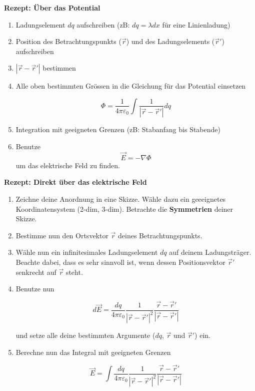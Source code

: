 \begin{tcolorbox}
    
    \footnotesize{
    \textbf{Rezept: Über das Potential}
    \begin{enumerate}
        \item Ladungselement $dq$ aufschreiben (zB: $dq = \lambda dx$ für eine Linienladung)
        \item Position des Betrachtungspunkts ($\vec{r}$) und des Ladungselements ($\vec{r}'$) aufschreiben
        \item $|\vec{r}- \vec{r}'|$ bestimmen
        \item Alle oben bestimmten Grössen in die Gleichung für das Potential einsetzen
        
        \begin{equation*}
        \Phi = \frac{1}{4 \pi \varepsilon_0}\int \frac{1}{|\vec{r}- \vec{r}'|} dq
        \end{equation*}
        
        \item Integration mit geeigneten Grenzen (zB: Stabanfang bis Stabende)
        \item Benutze  \begin{equation*}
        \Vec{E} = - \nabla \Phi
    \end{equation*} um das elektrische Feld zu finden.
    \end{enumerate}}
    \end{tcolorbox}
\begin{tcolorbox}
    \footnotesize{
    \textbf{Rezept: Direkt über das elektrische Feld}
    \begin{enumerate}
    \item Zeichne deine Anordnung in eine Skizze. Wähle dazu ein geeeignetes Koordinatensystem (2-dim, 3-dim). Betrachte die \textbf{Symmetrien} deiner Skizze. 
    \item Bestimme nun den Ortsvektor $\Vec{r}$ deines Betrachtungspunkts.
    \item Wähle nun ein infinitesimales Ladungselement $dq$ auf deinem Ladungsträger. Beachte dabei, dass es sehr sinnvoll ist, wenn dessen Positionsvektor $\Vec{r}'$ senkrecht auf $\Vec{r}$ steht.
    \item Benutze nun
    
    \begin{equation*}
        d\Vec{E} = \frac{dq}{4 \pi \varepsilon_0} \frac{1}{|\Vec{r}- \Vec{r}'|^2} \frac{\Vec{r}- \Vec{r}'}{|\Vec{r}- \Vec{r}'|}
    \end{equation*}
    
    \noindent und setze alle deine bestimmten Argumente ($dq$, $\Vec{r}$ und $\Vec{r}'$) ein. 
    \item Berechne nun das Integral mit geeigneten Grenzen
    
    \begin{equation*}
        \vec{E} = \int \frac{dq}{4 \pi \varepsilon_0} \frac{1}{|\Vec{r}- \Vec{r}'|^2} \frac{\Vec{r}- \Vec{r}'}{|\Vec{r}- \Vec{r}'|}
    \end{equation*}
    \end{enumerate}}
    \end{tcolorbox}
    
